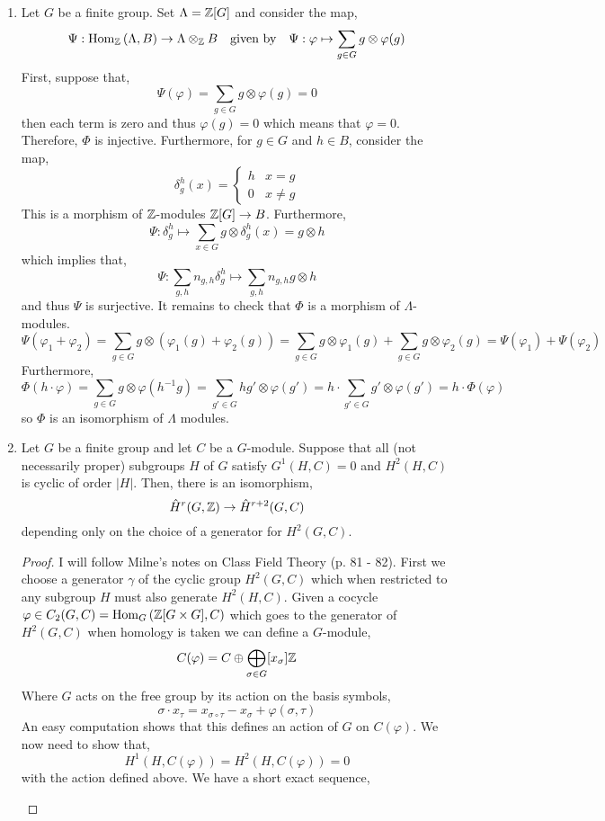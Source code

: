 \documentclass[12pt]{extarticle}
\begin{document}
\begin{enumerate}
\item Let $G$ be a finite group. Set $\Lambda = \mathbb{Z}[G]$ and consider the map,
\[ \Psi : \mathrm{Hom}_{\mathbb{Z}}\left(\Lambda, B\right) \to \Lambda \otimes_{\mathbb{Z}} B \quad \text{given by} \quad \Psi : \varphi \mapsto \sum_{g \in G} g \otimes \varphi(g)\]
First, suppose that,
\[ \Psi(\varphi) = \sum_{g \in G} g \otimes \varphi(g) = 0 \]
then each term is zero and thus $\varphi(g) = 0$ which means that $\varphi = 0$. Therefore, $\Phi$ is injective. Furthermore, for $g \in G$ and $h \in B$, consider the map,
\[ \delta^h_g(x) = \begin{cases}
h &  x = g \\ 
0 & x \neq g
\end{cases} \]
This is a morphism of $\mathbb{Z}$-modules $\mathbb{Z}[G] \to B$. Furthermore,
\[ \Psi : \delta^h_g \mapsto \sum_{x \in G} g \otimes \delta^h_g(x) = g \otimes h \]
which implies that,
\[ \Psi : \sum_{g, h} n_{g,h} \delta^h_g \mapsto \sum_{g, h} n_{g, h} g \otimes h \]
and thus $\Psi$ is surjective. It remains to check that $\Phi$ is a morphism of $\Lambda$-modules. 
\[ \Psi(\varphi_1 + \varphi_2) = \sum_{g \in G} g \otimes (\varphi_1(g) + \varphi_2(g)) = \sum_{g \in G} g \otimes \varphi_1(g) + \sum_{g \in G} g \otimes \varphi_2(g) = \Psi(\varphi_1) + \Psi(\varphi_2) \]
Furthermore,
\[ \Phi( h \cdot \varphi) = \sum_{g \in G} g \otimes \varphi(h^{-1} g) = \sum_{g' \in G} hg' \otimes \varphi(g') = h \cdot \sum_{g' \in G} g'
\otimes \varphi(g') = h \cdot \Phi(\varphi) \]
so $\Phi$ is an isomorphism of $\Lambda$ modules.
\item
\begin{theorem}[Tate]
Let $G$ be a finite group and let $C$ be a $G$-module. Suppose that all (not necessarily proper) subgroups $H$ of $G$ satisfy $G^1(H, C) = 0$ and $H^2(H, C)$ is cyclic of order $|H|$. Then, there is an isomorphism,
\[ \hat{H}^r(G, \mathbb{Z}) \to \hat{H}^{r+2}(G, C) \]
depending only on the choice of a generator for $H^2(G, C)$.
\end{theorem}

\begin{proof}
I will follow Milne's notes on Class Field Theory (p. 81 - 82). First we choose a generator $\gamma$ of the cyclic group $H^2(G, C)$ which when restricted to any subgroup $H$ must also generate $H^2(H, C)$. Given a cocycle $\varphi \in C_2(G, C) = \mathrm{Hom}_{G}\left(\mathbb{Z}[G \times G], C\right)$ which goes to the generator of $H^2(G, C)$ when homology is taken we can define a $G$-module,
\[ C(\varphi) = C \oplus \bigoplus_{\sigma \in G} [x_{\sigma}] \mathbb{Z} \]
Where $G$ acts on the free group by its action on the basis symbols,
\[ \sigma \cdot x_{\tau} = x_{\sigma \circ \tau} - x_{\sigma} + \varphi(\sigma, \tau) \]
An easy computation shows that this defines an action of $G$ on $C(\varphi)$. We now need to show that,
\[ H^1(H, C(\varphi)) = H^2(H, C(\varphi)) = 0 \]
with the action defined above. We have a short exact sequence,
\begin{center}
\end{center}


\end{proof}
\end{enumerate}
\end{document}
